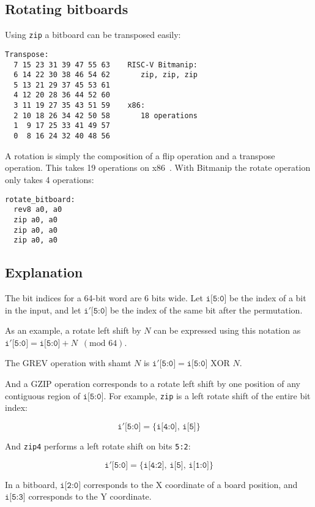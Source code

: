 \subsection{Rotating bitboards}

Using {\tt zip} a bitboard can be transposed easily:
\label{transposebitboard}

\begin{verbatim}
Transpose:
  7 15 23 31 39 47 55 63    RISC-V Bitmanip:
  6 14 22 30 38 46 54 62       zip, zip, zip
  5 13 21 29 37 45 53 61
  4 12 20 28 36 44 52 60
  3 11 19 27 35 43 51 59    x86:
  2 10 18 26 34 42 50 58       18 operations
  1  9 17 25 33 41 49 57
  0  8 16 24 32 40 48 56
\end{verbatim}

A rotation is simply the composition of a flip operation and a transpose
operation. This takes 19 operations on x86~\cite{ChessProg}. With Bitmanip
the rotate operation only takes 4 operations:

\begin{verbatim}
rotate_bitboard:
  rev8 a0, a0
  zip a0, a0
  zip a0, a0
  zip a0, a0
\end{verbatim}

\subsection{Explanation}

The bit indices for a 64-bit word are 6 bits wide. Let $\texttt{i[5:0]}$ be the
index of a bit in the input, and let $\texttt{i$'$[5:0]}$ be the index of the
same bit after the permutation.

As an example, a rotate left shift by $N$ can be expressed using this notation
as $\texttt{i$'$[5:0]} = \texttt{i[5:0]} + N \,\,\, (\textrm{mod 64})$.

The GREV operation with shamt $N$ is $\texttt{i$'$[5:0]} = \texttt{i[5:0]} \textrm{ XOR } N$.

And a GZIP operation corresponds to a rotate left shift by one position of any
contiguous region of $\texttt{i[5:0]}$. For example, {\tt zip} is a left rotate shift
of the entire bit index:

$$\texttt{i$'$[5:0]} = \{ \texttt{i[4:0]},\, \texttt{i[5]} \}$$

And {\tt zip4} performs a left rotate shift on bits {\tt 5:2}:

$$\texttt{i$'$[5:0]} = \{ \texttt{i[4:2]},\, \texttt{i[5]},\, \texttt{i[1:0]} \}$$

In a bitboard, $\texttt{i[2:0]}$ corresponds to the X coordinate of a board position, and
$\texttt{i[5:3]}$ corresponds to the Y coordinate.

